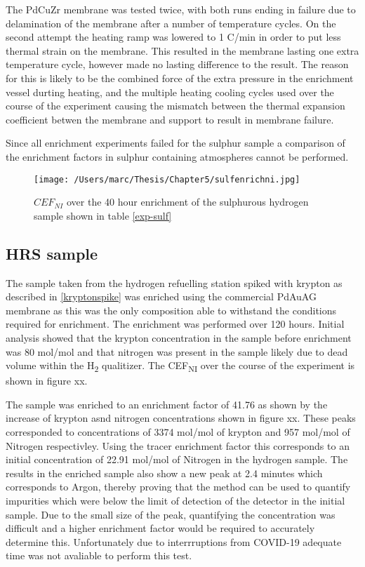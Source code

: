 The PdCuZr membrane was tested twice, with both runs ending in failure due to delamination of the membrane after a number of temperature cycles. On the second attempt the heating ramp was lowered to 1 \textdegree C/min in order to put less thermal strain on the membrane. This resulted in the membrane lasting one extra temperature cycle, however made no lasting difference to the result. The reason for this is likely to be the combined force of the extra pressure in the enrichment vessel durting heating, and the multiple heating cooling cycles used over the course of the experiment causing the mismatch between the thermal expansion coefficient betwen the membrane and support to result in membrane failure. 

Since all enrichment experiments failed for the sulphur sample a comparison of the enrichment factors in sulphur containing atmospheres cannot be performed. 

\begin{landscape}
    \begin{figure}
        \centering
        \texttt{[image: /Users/marc/Thesis/Chapter5/sulfenrichni.jpg]}
        \caption{$CEF_{NI}$ over the 40 hour enrichment of the sulphurous hydrogen sample shown in table \ref{exp-sulf}}
        \label{GCSULF}
    \end{figure}
\end{landscape}

\subsection{HRS sample}
The sample taken from the hydrogen refuelling station spiked with krypton as described in \ref{kryptonspike} was enriched using the commercial PdAuAG membrane as this was the only composition able to withstand the conditions required for enrichment. The enrichment was performed over 120 hours. Initial analysis showed that the krypton concentration in the sample before enrichment was 80 \textmu mol/mol and that nitrogen was present in the sample likely due to dead volume within the H\textsubscript{2} qualitizer. The CEF\textsubscript{NI} over the course of the experiment is shown in figure xx.

The sample was enriched to an enrichment factor of 41.76 as shown by the increase of krypton asnd nitrogen concentrations shown in figure xx. These peaks corresponded to concentrations of 3374 \textmu mol/mol of krypton and 957 \textmu mol/mol of Nitrogen respectivley. Using the tracer enrichment factor this corresponds to an initial concentration  of 22.91 \textmu mol/mol of Nitrogen  in the hydrogen sample. The results in the enriched sample also show a new peak at 2.4 minutes which corresponds to Argon, thereby proving that the method can be used to quantify impurities which were below the limit of detection of the detector in the initial sample. Due to the small size of the peak, quantifying the concentration was difficult and a higher enrichment factor would be required to accurately determine this. Unfortunately due to interrruptions from COVID-19 adequate time was not avaliable to perform this test. 

